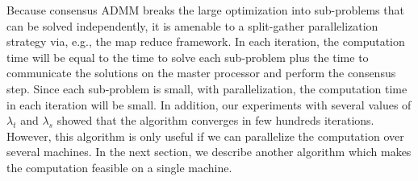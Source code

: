 \documentclass{article}
\newcommand{\attn}[1]{\textcolor{red}{TODO: #1}}
\begin{document}


Because consensus ADMM breaks the large optimization into
sub-problems that can be solved independently, it is amenable to a
split-gather parallelization strategy via, e.g., the map reduce framework.
In each iteration, the
computation time will be equal to the time to solve each sub-problem
plus the time to communicate the solutions on the master processor
and perform the consensus step. Since each sub-problem is
small, with parallelization, the computation time in each iteration
will be small. In addition, our experiments with several values of
$\lambda_t$ and $\lambda_s$ showed that the algorithm converges in few
hundreds iterations. 
However, this algorithm is only useful if we can parallelize the
computation over several machines. In the next section, we describe
another algorithm which makes the computation feasible on a single
machine. 
\end{document}
